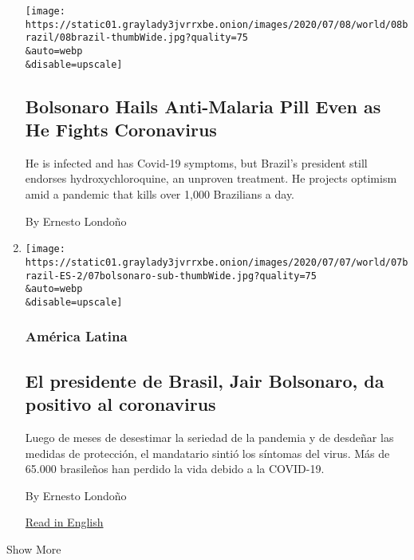 \begin{enumerate}
  \texttt{[image: https://static01.graylady3jvrrxbe.onion/images/2020/07/08/world/08brazil/08brazil-thumbWide.jpg?quality=75\\\&auto=webp\\\&disable=upscale]}

  \hypertarget{bolsonaro-hails-anti-malaria-pill-even-as-he-fights-coronavirus}{%
  \subsection{Bolsonaro Hails Anti-Malaria Pill Even as He Fights
  Coronavirus}\label{bolsonaro-hails-anti-malaria-pill-even-as-he-fights-coronavirus}}

  He is infected and has Covid-19 symptoms, but Brazil's president still
  endorses hydroxychloroquine, an unproven treatment. He projects
  optimism amid a pandemic that kills over 1,000 Brazilians a day.

  By Ernesto Londoño
\item
  \href{/es/2020/07/07/espanol/america-latina/bolsonaro-coronavirus.html}{}

  \texttt{[image: https://static01.graylady3jvrrxbe.onion/images/2020/07/07/world/07brazil-ES-2/07bolsonaro-sub-thumbWide.jpg?quality=75\\\&auto=webp\\\&disable=upscale]}

  \hypertarget{amuxe9rica-latina-1}{%
  \subsubsection{América Latina}\label{amuxe9rica-latina-1}}

  \hypertarget{el-presidente-de-brasil-jair-bolsonaro-da-positivo-al-coronavirus}{%
  \subsection{El presidente de Brasil, Jair Bolsonaro, da positivo al
  coronavirus}\label{el-presidente-de-brasil-jair-bolsonaro-da-positivo-al-coronavirus}}

  Luego de meses de desestimar la seriedad de la pandemia y de desdeñar
  las medidas de protección, el mandatario sintió los síntomas del
  virus. Más de 65.000 brasileños han perdido la vida debido a la
  COVID-19.

  By Ernesto Londoño

  \href{https://www.nytimes3xbfgragh.onion/2020/07/07/world/americas/brazil-bolsonaro-coronavirus.html}{Read
  in English}
\end{enumerate}

Show More

